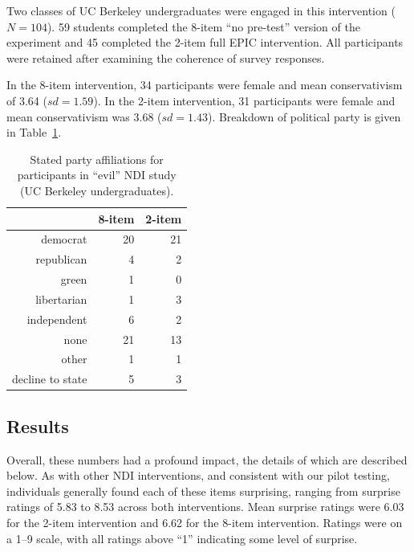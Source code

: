 Two classes of UC Berkeley undergraduates were engaged in this intervention
($N=104$). 59 students completed the 8-item “no pre-test” version of the
experiment and 45 completed the 2-item full EPIC intervention. All participants
were retained after examining the coherence of survey responses.

In the 8-item intervention, 34 participants were female and mean conservativism
of 3.64 ($sd=1.59$). In the 2-item intervention, 31 participants were female and
mean conservativism was 3.68 ($sd=1.43$). Breakdown of political party is given
in Table~\ref{table:evil-party}.

\begin{table}[ht]
\caption{Stated party affiliations for participants in “evil” NDI study (UC
    Berkeley undergraduates).}
\label{table:evil-party}
\centering
\begin{tabular}{rrr}
  \toprule
     & 8-item & 2-item \\ 
  \midrule
  democrat &  20 &  21 \\ 
  republican &   4 &   2 \\ 
  green &   1 &   0 \\ 
  libertarian &   1 &   3 \\ 
  independent &   6 &   2 \\ 
  none &  21 &  13 \\ 
  other &   1 &   1 \\ 
  decline to state &   5 &   3 \\ 
   \bottomrule
\end{tabular}
\end{table}
\subsection{Results}

Overall, these numbers had a profound impact, the details of which are described
below. As with other NDI interventions, and consistent with our pilot testing,
individuals generally found each of these items surprising, ranging from
surprise ratings of 5.83 to 8.53 across both interventions. Mean surprise
ratings were 6.03 for the 2-item intervention and 6.62 for the 8-item
intervention. Ratings were on a 1--9 scale, with all ratings above “1”
indicating some level of surprise.

